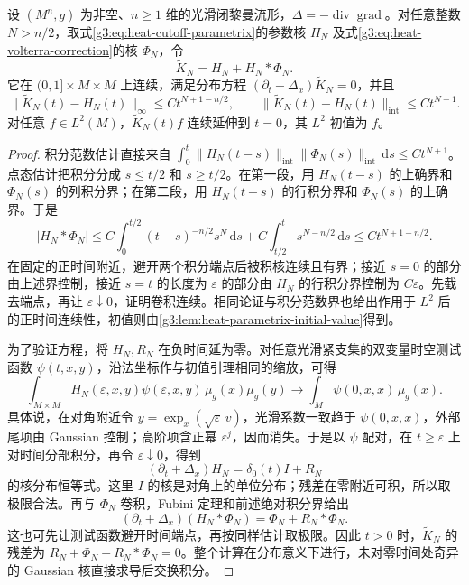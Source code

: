 \begin{proposition}\label{g3:prop:heat-local-corrected-kernel}
	设 \((M^n,g)\) 为非空、\(n\ge1\) 维的光滑闭黎曼流形，\(\Delta=-\operatorname{div}\operatorname{grad}\)。对任意整数 \(N>n/2\)，取式\eqref{g3:eq:heat-cutoff-parametrix}的参数核 \(H_N\) 及式\eqref{g3:eq:heat-volterra-correction}的核 \(\Phi_N\)，令
	\begin{equation}\label{g3:eq:heat-local-corrected-kernel}
		\widetilde K_N=H_N+H_N*\Phi_N.
	\end{equation}
	它在 \((0,1]\times M\times M\) 上连续，满足分布方程
	\((\partial_t+\Delta_x)\widetilde K_N=0\)，并且
	\begin{equation}\label{g3:eq:heat-volterra-remainder}
		\|\widetilde K_N(t)-H_N(t)\|_\infty
		\le Ct^{N+1-n/2},\qquad
		\|\widetilde K_N(t)-H_N(t)\|_{\mathrm{int}}
		\le Ct^{N+1}.
	\end{equation}
	对任意 \(f\in L^2(M)\)，\(\widetilde K_N(t)f\) 连续延伸到 \(t=0\)，其 \(L^2\) 初值为 \(f\)。
\end{proposition}
\begin{proof}
	积分范数估计直接来自
	\(\int_0^t\|H_N(t-s)\|_{\mathrm{int}}
	\|\Phi_N(s)\|_{\mathrm{int}}\,\mathrm ds\le Ct^{N+1}\)。
	点态估计把积分分成 \(s\le t/2\) 和 \(s\ge t/2\)。在第一段，用 \(H_N(t-s)\) 的上确界和 \(\Phi_N(s)\) 的列积分界；在第二段，用 \(H_N(t-s)\) 的行积分界和 \(\Phi_N(s)\) 的上确界。于是
	\[
		|H_N*\Phi_N|
		\le C\int_0^{t/2}(t-s)^{-n/2}s^N\,\mathrm ds
		+C\int_{t/2}^ts^{N-n/2}\,\mathrm ds
		\le Ct^{N+1-n/2}.
	\]
	在固定的正时间附近，避开两个积分端点后被积核连续且有界；接近 \(s=0\) 的部分由上述界控制，接近 \(s=t\) 的长度为 \(\varepsilon\) 的部分由 \(H_N\) 的行积分界控制为 \(C\varepsilon\)。先截去端点，再让 \(\varepsilon\downarrow0\)，证明卷积连续。相同论证与积分范数界也给出作用于 \(L^2\) 后的正时间连续性，初值则由\cref{g3:lem:heat-parametrix-initial-value}得到。

	为了验证方程，将 \(H_N,R_N\) 在负时间延为零。对任意光滑紧支集的双变量时空测试函数 \(\psi(t,x,y)\)，沿法坐标作与初值引理相同的缩放，可得
	\[
		\int_{M\times M}H_N(\varepsilon,x,y)\psi(\varepsilon,x,y)
		\,\mu_g(x)\mu_g(y)
		\longrightarrow\int_M\psi(0,x,x)\,\mu_g(x).
	\]
	具体说，在对角附近令 \(y=\exp_x(\sqrt\varepsilon\,v)\)，光滑系数一致趋于 \(\psi(0,x,x)\)，外部尾项由 Gaussian 控制；高阶项含正幂 \(\varepsilon^j\)，因而消失。于是以 \(\psi\) 配对，在 \(t\ge\varepsilon\) 上对时间分部积分，再令 \(\varepsilon\downarrow0\)，得到
	\[
		(\partial_t+\Delta_x)H_N
		=\delta_0(t)I+R_N
	\]
	的核分布恒等式。这里 \(I\) 的核是对角上的单位分布；残差在零附近可积，所以取极限合法。再与 \(\Phi_N\) 卷积，Fubini 定理和前述绝对积分界给出
	\[
		(\partial_t+\Delta_x)(H_N*\Phi_N)
		=\Phi_N+R_N*\Phi_N.
	\]
	这也可先让测试函数避开时间端点，再按同样估计取极限。因此 \(t>0\) 时，\(\widetilde K_N\) 的残差为 \(R_N+\Phi_N+R_N*\Phi_N=0\)。整个计算在分布意义下进行，未对零时间处奇异的 Gaussian 核直接求导后交换积分。
\end{proof}

